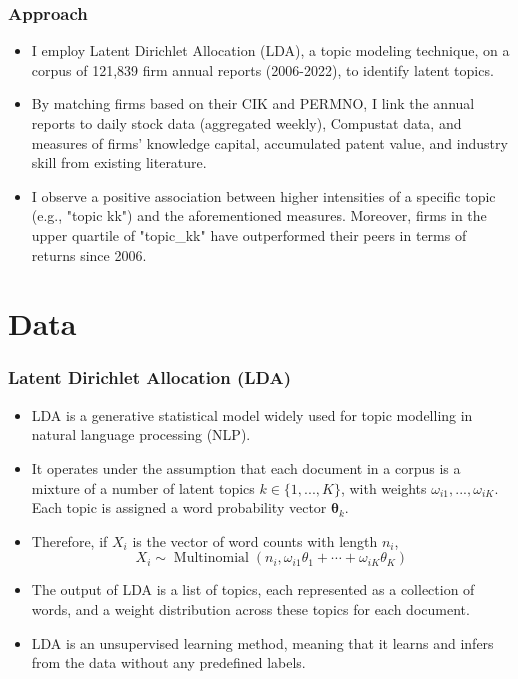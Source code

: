 \documentclass{beamer}
\begin{document}
\begin{frame}
\frametitle{Approach}
\begin{itemize}
\item I employ Latent Dirichlet Allocation (LDA), a topic modeling technique, on a corpus of 121,839 firm annual reports (2006-2022), to identify latent topics.
\item By matching firms based on their CIK and PERMNO, I link the annual reports to daily stock data (aggregated weekly), Compustat data, and measures of firms' knowledge capital, accumulated patent value, and industry skill from existing literature.
\item I observe a positive association between higher intensities of a specific topic (e.g., "topic kk") and the aforementioned measures. Moreover, firms in the upper quartile of "topic\_kk" have outperformed their peers in terms of returns since 2006.
\end{itemize}

\end{frame}

\section{Data}

\begin{frame}
\frametitle{Latent Dirichlet Allocation (LDA)}
\begin{itemize}
\small
\item LDA is a generative statistical model widely used for topic modelling in natural language processing (NLP).
\item It operates under the assumption that each document in a corpus is a mixture of a number of latent topics $k \in \{1, ..., K\}$, with weights $\omega_{i1}, ..., \omega_{iK}$. Each topic is assigned a word probability vector $\mathbf{\theta}_k$. 
\item Therefore, if $X_i$ is the vector of word counts with length $n_i$, 
\begin{equation}
X_i \sim \operatorname{Multinomial}\left(n_i, \omega_{i 1} \theta_1+\cdots+\omega_{i K} \theta_K\right)
\end{equation}
\item The output of LDA is a list of topics, each represented as a collection of words, and a weight distribution across these topics for each document.
\item LDA is an unsupervised learning method, meaning that it learns and infers from the data without any predefined labels.
\end{itemize}
\end{frame}
\end{document}
